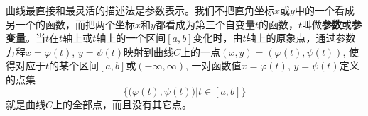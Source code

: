 曲线最直接和最灵活的描述法是参数表示。我们不把直角坐标$x$或$y$中的一个看成另一个的函数，而把两个坐标$x$和$y$都看成为第三个自变量$t$的函数，$t$叫做\textbf{参数}或\textbf{参变量}。当$t$在$t$轴上或$t$轴上的一个区间$[a,b]$变化时，由$t$轴上的原象点，通过参数方程$x=\varphi(t)$, $y=\psi(t)$映射到曲线$C$上的一点$(x,y)=(\varphi(t),\psi(t))$, 使得对应于$t$的某个区间$[a,b]$或$(-\infty, \infty)$, 一对函数值$x=\varphi(t)$, $y=\psi(t)$定义的点集
$$\Big\{\big(\varphi(t), \psi(t)\big)\Big|t\in [a,b]\Big\}$$
就是曲线$C$上的全部点，而且没有其它点。




\begin{example}
    
\end{example}


\begin{solution}
    
\end{solution}



\begin{example}
    
\end{example}


\begin{solution}
    
\end{solution}







\begin{example}
    
\end{example}


\begin{solution}
    
\end{solution}






\begin{example}
    
\end{example}


\begin{solution}
    
\end{solution}



















































